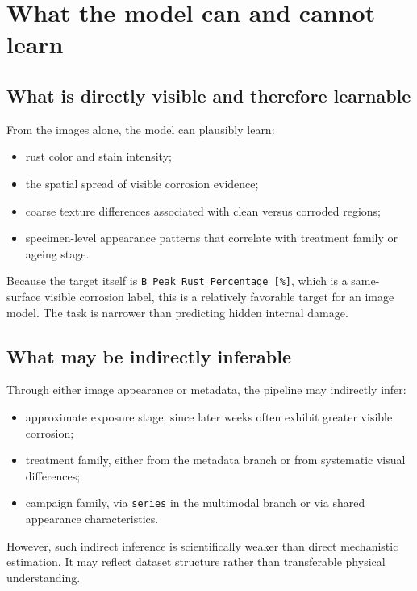 \documentclass[11pt]{article}
\begin{document}
\section{What the model can and cannot learn}

\subsection{What is directly visible and therefore learnable}
From the images alone, the model can plausibly learn:
\begin{itemize}
  \item rust color and stain intensity;
  \item the spatial spread of visible corrosion evidence;
  \item coarse texture differences associated with clean versus corroded regions;
  \item specimen-level appearance patterns that correlate with treatment family or ageing stage.
\end{itemize}

Because the target itself is \texttt{B\_Peak\_Rust\_Percentage\_[\%]}, which is a same-surface visible corrosion label, this is a relatively favorable target for an image model. The task is narrower than predicting hidden internal damage.

\subsection{What may be indirectly inferable}
Through either image appearance or metadata, the pipeline may indirectly infer:
\begin{itemize}
  \item approximate exposure stage, since later weeks often exhibit greater visible corrosion;
  \item treatment family, either from the metadata branch or from systematic visual differences;
  \item campaign family, via \texttt{series} in the multimodal branch or via shared appearance characteristics.
\end{itemize}

However, such indirect inference is scientifically weaker than direct mechanistic estimation. It may reflect dataset structure rather than transferable physical understanding.
\end{document}
